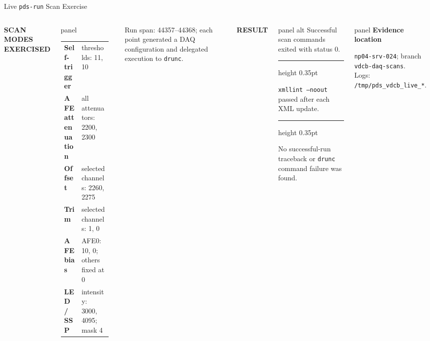 \documentclass[aspectratio=169,10pt]{beamer}
\newcommand{\eyebrow}[1]{{\color{noircyan}\small\bfseries #1\par}}
\newcommand{\blocksep}{%
  \vspace{0.7mm}%
  {\color{noirline}\hrule height 0.35pt}%
  \vspace{0.7mm}%
}
\begin{document}
\begin{frame}[t]{Live \texttt{pds-run} Scan Exercise}
\vspace{-1mm}
\begin{columns}[T,onlytextwidth]
\eyebrow{SCAN MODES EXERCISED}
\vspace{0.8mm}
\begin{beamercolorbox}[wd=\linewidth,sep=5pt,rounded=true]{panel}
\footnotesize
\renewcommand{\arraystretch}{1.22}
\begin{tabular}{@{}>{\raggedright\arraybackslash}p{0.32\linewidth}>{\raggedright\arraybackslash}p{0.57\linewidth}@{}}
\textbf{Self-trigger} & thresholds: 11, 10 \\
\textbf{AFE attenuation} & all attenuators: 2200, 2300 \\
\textbf{Offset} & selected channels: 2260, 2275 \\
\textbf{Trim} & selected channels: 1, 0 \\
\textbf{AFE bias} & AFE0: 10, 0; others fixed at 0 \\
\textbf{LED / SSP} & intensity: 3000, 4095; mask 4 \\
\end{tabular}
\end{beamercolorbox}

\vspace{1.1mm}
{\color{noirmuted}\footnotesize Run span: 44357--44368; each point generated a DAQ configuration and delegated execution to \texttt{drunc}.\par}

\eyebrow{RESULT}
\vspace{0.8mm}
\begin{beamercolorbox}[wd=\linewidth,sep=5pt,rounded=true]{panel alt}
\small
Successful scan commands exited with status 0.
\blocksep
\texttt{xmllint --noout} passed after each XML update.
\blocksep
No successful-run traceback or \texttt{drunc} command failure was found.
\end{beamercolorbox}

\vspace{0.8mm}
\begin{beamercolorbox}[wd=\linewidth,sep=4pt,rounded=true]{panel}
\footnotesize
\textcolor{noircyan}{\textbf{Evidence location}}\par
\texttt{np04-srv-024}; branch \texttt{vdcb-daq-scans}.\\
Logs: \texttt{/tmp/pds\_vdcb\_live\_*}.
\end{beamercolorbox}
\end{columns}
\end{frame}
\end{document}
